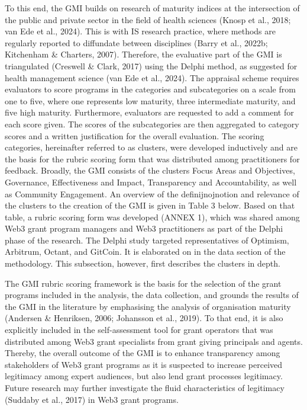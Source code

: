 \documentclass[conference]{IEEEtran}
\begin{document}
To this end, the GMI builds on research of maturity indices at the intersection of the public and private sector in the field of health sciences (Knosp et al., 2018; van Ede et al., 2024). This is with IS research practice, where methods are regularly reported to diffundate between disciplines (Barry et al., 2022b; Kitchenham \& Charters, 2007). Therefore, the evaluative part of the GMI is triangulated (Creswell \& Clark, 2017) using the Delphi method, as suggested for health management science (van Ede et al., 2024). The appraisal scheme requires evaluators to score programs in the categories and subcategories on a scale from one to five, where one represents low maturity, three intermediate maturity, and five high maturity. Furthermore, evaluators are requested to add a comment for each score given. The scores of the subcategories are then aggregated to category scores and a written justification for the overall evaluation. The scoring categories, hereinafter referred to as clusters, were developed inductively and are the basis for the rubric scoring form that was distributed among practitioners for feedback. Broadly, the GMI consists of the clusters Focus Areas and Objectives, Governance, Effectiveness and Impact, Transparency and Accountability, as well as Community Engagement. An overview of the definijnojnotion and relevance of the clusters to the creation of the GMI is given in Table 3 below. Based on that table, a rubric scoring form was developed (ANNEX 1), which was shared among Web3 grant program managers and Web3 practitioners as part of the Delphi phase of the research. The Delphi study targeted representatives of Optimism, Arbitrum, Octant, and GitCoin. It is elaborated on in the data section of the methodology. This subsection, however, first describes the clusters in depth.

The GMI rubric scoring framework is the basis for the selection of the grant programs included in the analysis, the data collection, and grounds the results of the GMI in the literature by emphasising the analysis of organisation maturity (Andersen \& Henriksen, 2006; Johansson et al., 2019). To that end, it is also explicitly included in the self-assessment tool for grant operators that was distributed among Web3 grant specialists from grant giving principals and agents. Thereby, the overall outcome of the GMI is to enhance transparency among stakeholders of Web3 grant programs as it is suspected to increase perceived legitimacy among expert audiences, but also lend grant processes legitimacy. Future research may further investigate the fluid characteristics of legitimacy (Suddaby et al., 2017) in Web3 grant programs.
\end{document}
